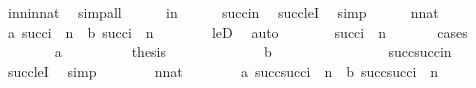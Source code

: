 \begin{isabellebody}
\ in{\isacharunderscore}{\kern0pt}n{\isacharunderscore}{\kern0pt}in{\isacharunderscore}{\kern0pt}nat\ \isamarkupfalse%
\ simp{\isacharunderscore}{\kern0pt}all\isanewline
\ \ \ \ \isamarkupfalse%
\ {\isacartoucheopen}i{\isacharless}{\kern0pt}n{\isacartoucheclose}\isanewline
\ \ \ \ \isamarkupfalse%
\ {\isachardoublequoteopen}succ{\isacharparenleft}{\kern0pt}i{\isacharparenright}{\kern0pt}{\isasymle}n{\isachardoublequoteclose}\ \isamarkupfalse%
\ succ{\isacharunderscore}{\kern0pt}leI\ \isamarkupfalse%
\ simp\isanewline
\ \ \ \ \isamarkupfalse%
\ {\isacartoucheopen}n{\isasymin}nat{\isacartoucheclose}\isanewline
\ \ \ \ \isamarkupfalse%
\ {\isacharparenleft}{\kern0pt}a{\isacharparenright}{\kern0pt}\ {\isachardoublequoteopen}succ{\isacharparenleft}{\kern0pt}i{\isacharparenright}{\kern0pt}\ {\isacharequal}{\kern0pt}\ n{\isachardoublequoteclose}\ {\isacharbar}{\kern0pt}\ {\isacharparenleft}{\kern0pt}b{\isacharparenright}{\kern0pt}\ {\isachardoublequoteopen}succ{\isacharparenleft}{\kern0pt}i{\isacharparenright}{\kern0pt}\ {\isacharless}{\kern0pt}\ n{\isachardoublequoteclose}\isanewline
\ \ \ \ \ \ \isamarkupfalse%
\ leD\ \isamarkupfalse%
\ auto\isanewline
\ \ \ \ \isamarkupfalse%
\ \isamarkupfalse%
\ {\isachardoublequoteopen}succ{\isacharparenleft}{\kern0pt}i{\isacharparenright}{\kern0pt}\ {\isacharequal}{\kern0pt}\ n{\isachardoublequoteclose}\ \isanewline
\ \ \ \ \isamarkupfalse%
\ cases\isanewline
\ \ \ \ \ \ \isamarkupfalse%
\ a\isanewline
\ \ \ \ \ \ \isamarkupfalse%
\ \isamarkupfalse%
\ {\isacharquery}{\kern0pt}thesis\ \isacommand{{\isachardot}{\kern0pt}}\isamarkupfalse%
\isanewline
\ \ \ \ \isamarkupfalse%
\isanewline
\ \ \ \ \ \ \isamarkupfalse%
\ b\isanewline
\ \ \ \ \ \ \isamarkupfalse%
\ \isanewline
\ \ \ \ \ \ \isamarkupfalse%
\ {\isachardoublequoteopen}succ{\isacharparenleft}{\kern0pt}succ{\isacharparenleft}{\kern0pt}i{\isacharparenright}{\kern0pt}{\isacharparenright}{\kern0pt}{\isasymle}n{\isachardoublequoteclose}\ \isamarkupfalse%
\ succ{\isacharunderscore}{\kern0pt}leI\ \isamarkupfalse%
\ simp\isanewline
\ \ \ \ \ \ \isamarkupfalse%
\ {\isacartoucheopen}n{\isasymin}nat{\isacartoucheclose}\isanewline
\ \ \ \ \ \ \isamarkupfalse%
\ {\isacharparenleft}{\kern0pt}a{\isacharparenright}{\kern0pt}\ {\isachardoublequoteopen}succ{\isacharparenleft}{\kern0pt}succ{\isacharparenleft}{\kern0pt}i{\isacharparenright}{\kern0pt}{\isacharparenright}{\kern0pt}\ {\isacharequal}{\kern0pt}\ n{\isachardoublequoteclose}\ {\isacharbar}{\kern0pt}\ {\isacharparenleft}{\kern0pt}b{\isacharparenright}{\kern0pt}\ {\isachardoublequoteopen}succ{\isacharparenleft}{\kern0pt}succ{\isacharparenleft}{\kern0pt}i{\isacharparenright}{\kern0pt}{\isacharparenright}{\kern0pt}\ {\isacharless}{\kern0pt}\ n{\isachardoublequoteclose}\isanewline

\end{isabellebody}
